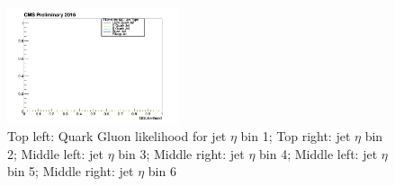 \begin{figure}[htbp]
\begin{center}
  \includegraphics[width=0.45\textwidth]{sections/mc4/TopTagger/figures/_b_qglikelihoodjetetabin5_.png}
 \end{center}
 \caption{Top left: Quark Gluon likelihood for jet $\eta$ bin 1; Top right: jet $\eta$ bin 2; Middle left: jet $\eta$ bin 3; Middle right: jet $\eta$ bin 4; Middle left: jet $\eta$ bin 5; Middle right: jet $\eta$ bin 6}
 \label{fig:c4ttqgljeteta}
\end{figure}

